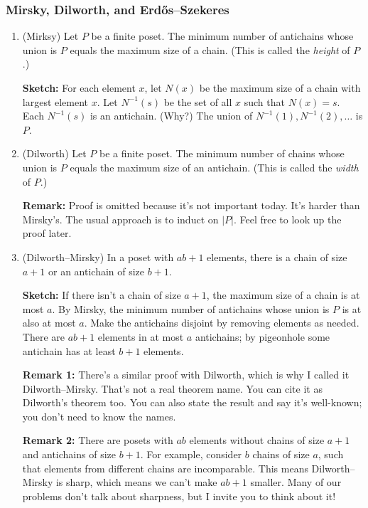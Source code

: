 \documentclass[11pt,paper=letter]{scrartcl}
\begin{document}
\subsubsection*{Mirsky, Dilworth, and Erd\H{o}s--Szekeres}

\begin{enumerate}

\item (Mirksy) Let $P$ be a finite poset. The minimum number of antichains whose union is $P$ equals the maximum size of a chain. (This is called the \textit{height} of $P$.)

\textbf{Sketch:} For each element $x$, let $N(x)$ be the maximum size of a chain with largest element $x$. Let $N^{-1}(s)$ be the set of all $x$ such that $N(x) = s$. Each $N^{-1}(s)$ is an antichain. (Why?) The union of $N^{-1}(1), N^{-1}(2), \ldots$ is $P$.

\item (Dilworth) Let $P$ be a finite poset. The minimum number of chains whose union is $P$ equals the maximum size of an antichain. (This is called the \textit{width} of $P$.)

\textbf{Remark:} Proof is omitted because it's not important today. It's harder than Mirsky's. The usual approach is to induct on $|P|$. Feel free to look up the proof later.

\item (Dilworth--Mirsky) In a poset with $ab + 1$ elements, there is a chain of size $a + 1$ or an antichain of size $b + 1$.

\textbf{Sketch:} If there isn't a chain of size $a + 1$, the maximum size of a chain is at most $a$. By Mirsky, the minimum number of antichains whose union is $P$ is at also at most $a$. Make the antichains disjoint by removing elements as needed. There are $ab + 1$ elements in at most $a$ antichains; by pigeonhole some antichain has at least $b + 1$ elements.

\textbf{Remark 1:} There's a similar proof with Dilworth, which is why I called it Dilworth--Mirsky. That's not a real theorem name. You can cite it as Dilworth's theorem too. You can also state the result and say it's well-known; you don't need to know the names.

\textbf{Remark 2:} There are posets with $ab$ elements without chains of size $a + 1$ and antichains of size $b + 1$. For example, consider $b$ chains of size $a$, such that elements from different chains are incomparable. This means Dilworth--Mirsky is sharp, which means we can't make $ab + 1$ smaller. Many of our problems don't talk about sharpness, but I invite you to think about it!


\end{enumerate}
\end{document}
